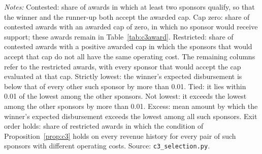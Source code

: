 \begin{table}[htbp]
\par\smallskip\begin{minipage}{\textwidth}\footnotesize\textit{Notes:} Contested: share of awards in which at least two sponsors qualify, so that the winner and the runner-up both accept the awarded cap. Cap zero: share of contested awards with an awarded cap of zero, in which no sponsor would receive support; these awards remain in Table~\ref{tab:c3award}. Restricted: share of contested awards with a positive awarded cap in which the sponsors that would accept that cap do not all have the same operating cost. The remaining columns refer to the restricted awards, with every sponsor that would accept the cap evaluated at that cap. Strictly lowest: the winner's expected disbursement is below that of every other such sponsor by more than 0.01. Tied: it lies within 0.01 of the lowest among the other sponsors. Not lowest: it exceeds the lowest among the other sponsors by more than 0.01. Excess: mean amount by which the winner's expected disbursement exceeds the lowest among all such sponsors. Exit order holds: share of restricted awards in which the condition of Proposition~\ref{prop:c3} holds on every revenue history for every pair of such sponsors with different operating costs. Source: \texttt{c3\_selection.py}.\end{minipage}
\end{table}

